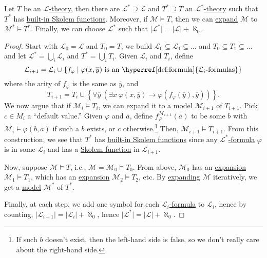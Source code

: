 \begin{lemma}\label{lma:Skolemization}
	Let \(T\) be an \hyperref[def:theory]{\(\mathcal{L} \)-theory}, then there are \(\mathcal{L} ^{\ast} \supseteq \mathcal{L} \) and \(T^{\ast} \supseteq T\) an \hyperref[def:theory]{\(\mathcal{L} ^{\ast} \)-theory} such that \(T^{\ast} \) has \hyperref[def:built-in-Skolem-function]{built-in Skolem functions}. Moreover, if \(\mathcal{M} \models T\), then we can \hyperref[not:expansion]{expand} \(\mathcal{M} \) to \(\mathcal{M} ^{\ast} \models T^{\ast} \). Finally, we can choose \(\mathcal{L} ^{\ast} \) such that \(\vert \mathcal{L} ^{\ast} \vert = \vert \mathcal{L} \vert + \aleph_0\).
\end{lemma}
\begin{proof}
	Start with \(\mathcal{L} _0 = \mathcal{L} \) and \(T_0 = T\), we build \(\mathcal{L} _0 \subseteq \mathcal{L} _1 \subseteq \dots \) and \(T_0 \subseteq T_1 \subseteq \dots \) and let \(\mathcal{L} ^{\ast} = \bigcup_{i} \mathcal{L} _i\) and \(T^{\ast} = \bigcup_{i} T_i\). Given \(\mathcal{L} _i\) and \(T_i\), define
	\[
		\mathcal{L} _{i+1} = \mathcal{L} _i \cup \left\{ f_\varphi \mid \varphi (x, \overline{y} ) \text{ is an \hyperref[def:formula]{\(\mathcal{L} _i \)-formulas}} \right\}
	\]
	where the arity of \(f_\varphi \) is the same as \(\overline{y} \), and
	\[
		T_{i+1} = T_i \cup \left\{ \forall \overline{y} \ (\exists x\ \varphi (x, \overline{y} ) \to \varphi (f_\varphi (\overline{y} ) , \overline{y} ) ) \right\}.
	\]
	We now argue that if \(\mathcal{M}_i \models T_i\), we can \hyperref[not:expansion]{expand} it to a \hyperref[def:model]{model} \(\mathcal{M} _{i+1} \) of \(T_{i+1} \). Pick \(c\in M_i\) a ``default value.'' Given \(\varphi \) and \(\overline{a} \), define \(f_\varphi ^{\mathcal{M} _{i+1} }(\overline{a} )\) to be some \(b\) with \(\mathcal{M}_i \models \varphi (b, \overline{a} )\) if such a \(b\) exists, or \(c\) otherwise.\footnote{If such \(b\) doesn't exist, then the left-hand side is false, so we don't really care about the right-hand side.} Then, \(\mathcal{M} _{i+1} \models T_{i+1} \). From this construction, we see that \(T^{\ast} \) has \hyperref[def:built-in-Skolem-function]{built-in Skolem functions} since any \hyperref[def:formula]{\(\mathcal{L}^{\ast}\)-formula} \(\varphi \) is in some \(\mathcal{L} _i\) and has a \hyperref[def:built-in-Skolem-function]{Skolem function} in \(\mathcal{L} _{i+1}\).

	Now, suppose \(\mathcal{M} \models T\), i.e., \(\mathcal{M} = \mathcal{M} _0 \models T_0\). From above, \(\mathcal{M} _0\) has an \hyperref[not:expansion]{expansion} \(\mathcal{M} _1 \models T_1\), which has an \hyperref[not:expansion]{expansion} \(\mathcal{M} _2 \models T_2\), etc. By \hyperref[not:expansion]{expanding} \(\mathcal{M}\) iteratively, we get a \hyperref[def:model]{model} \(\mathcal{M} ^{\ast}\) of \(T^{\ast} \).

	Finally, at each step, we add one symbol for each \hyperref[def:formula]{\(\mathcal{L} _i\)-formula} to \(\mathcal{L} _i\), hence by counting, \(\vert \mathcal{L} _{i+1} \vert = \vert \mathcal{L} _i \vert + \aleph_0\), hence \(\vert \mathcal{L} ^{\ast} \vert = \vert \mathcal{L} \vert + \aleph_0\).
\end{proof}

